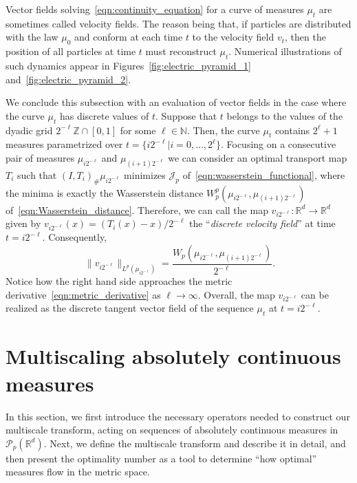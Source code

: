 \documentclass[12pt]{amsart}
\begin{document}
Vector fields solving~\eqref{eqn:continuity_equation} for a curve of measures $\mu_t$ are sometimes called velocity fields. The reason being that, if particles are distributed with the law $\mu_0$ and conform at each time $t$ to the velocity field $v_t$, then the position of all particles at time $t$ must reconstruct $\mu_t$. Numerical illustrations of such dynamics appear in Figures~\ref{fig:electric_pyramid_1} and~\ref{fig:electric_pyramid_2}.

We conclude this subsection with an evaluation of vector fields in the case where the curve $\mu_t$ has discrete values of $t$. Suppose that $t$ belongs to the values of the dyadic grid $2^{-\ell}\mathbb{Z}\cap[0, 1]$ for some $\ell\in\mathbb{N}$. Then, the curve $\mu_t$ contains $2^\ell + 1$ measures parametrized over $t=\{i 2^{-\ell} | i=0,\dots, 2^\ell\}$. Focusing on a consecutive pair of measures $\mu_{i 2^{-\ell}}$ and $\mu_{(i+1) 2^{-\ell}}$ we can consider an optimal transport map $T_i$ such that $(I, T_i)_\#\mu_{i 2^{-\ell}}$ minimizes $\mathcal{J}_p$ of~\eqref{eqn:wasserstein_functional}, where the minima is exactly the Wasserstein distance $W^p_p(\mu_{i 2^{-\ell}}, \mu_{(i+1) 2^{-\ell}})$ of~\eqref{eqn:Wasserstein_distance}. Therefore, we can call the map $v_{i 2^{-\ell}}:\mathbb{R}^d\rightarrow\mathbb{R}^d$ given by $v_{i 2^{-\ell}}(x)=(T_i(x)-x)/2^{-\ell}$ the ``\emph{discrete velocity field}'' at time $t=i 2^{-\ell}$. Consequently,
\begin{equation}~\label{eqn:norm_discrete_tangent_vector}
    \|v_{i 2^{-\ell}}\|_{L^p(\mu_{i 2^{-\ell}})}=\frac{W_p(\mu_{i 2^{-\ell}}, \mu_{(i+1) 2^{-\ell}})}{2^{-\ell}}.
\end{equation}
Notice how the right hand side approaches the metric derivative~\eqref{eqn:metric_derivative} as $\ell\rightarrow\infty$. Overall, the map $v_{i 2^{-\ell}}$ can be realized as the discrete tangent vector field of the sequence $\mu_t$ at $t=i 2^{-\ell}$.

\section{Multiscaling absolutely continuous measures}\label{sec:Multiscaling_continuous}

In this section, we first introduce the necessary operators needed to construct our multiscale transform, acting on sequences of absolutely continuous measures in $\mathcal{P}_p(\mathbb{R}^d)$. Next, we define the multiscale transform and describe it in detail, and then present the optimality number as a tool to determine ``how optimal'' measures flow in the metric space.
\end{document}
